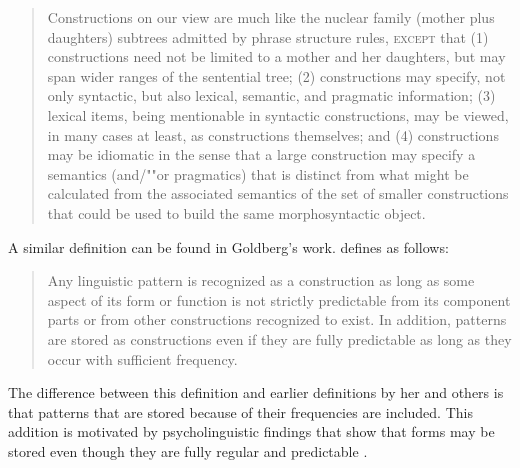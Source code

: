 \documentclass[output=paper,biblatex,babelshorthands,newtxmath,draftmode,colorlinks,citecolor=brown]{langscibook}
\begin{document}
\begin{quote}\label{def-construction-fillmore}
Constructions on our view are much like the nuclear family (mother plus daughters) subtrees
admitted by phrase structure rules, \textsc{except} that (1) constructions need not be limited to a mother
and her daughters, but may span wider ranges of the sentential tree; (2) constructions may specify,
not only syntactic, but also lexical, semantic, and pragmatic information; (3) lexical items,
being mentionable in syntactic constructions, may be viewed, in many cases at least, as
constructions themselves; and (4) constructions may be idiomatic in the sense that a large
construction may specify a semantics (and/""or pragmatics) that is distinct from what might be
calculated from the associated semantics of the set of smaller constructions that could be used to
build the same morphosyntactic object. \citep[]{FKoC88a}
\end{quote}
A similar definition can be found in Goldberg's work. \citet[]{Goldberg2006a} defines  as follows:
\begin{quote}
Any linguistic pattern is recognized as a construction as long as some aspect of its form or
function is not strictly predictable from its component parts or from other constructions recognized
to exist. In addition, patterns are stored as constructions even if they are fully predictable as
long as they occur with sufficient frequency. \citep[]{Goldberg2006a}
\end{quote}
The difference between this definition and earlier definitions by her and others is that patterns
that are stored because of their frequencies are included. This addition is motivated by
psycholinguistic findings that show that forms may be stored even though they are fully regular and
predictable \parencites{Bybee95a-u}[]{PJ2005a}.
%
\end{document}
